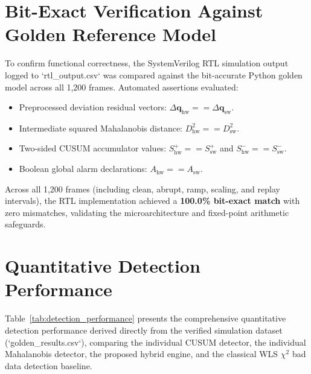 \documentclass[12pt,a4paper]{report}
\begin{document}
\section{Bit-Exact Verification Against Golden Reference Model}
To confirm functional correctness, the SystemVerilog RTL simulation output logged to
`rtl_output.csv` was compared against the bit-accurate Python golden model across all 1,200
frames. Automated assertions evaluated:
\begin{itemize}
    \item Preprocessed deviation residual vectors: $\Delta\boldsymbol{q}_{\text{hw}} == \Delta\boldsymbol{q}_{\text{sw}}$.
    \item Intermediate squared Mahalanobis distance: $D^2_{\text{hw}} == D^2_{\text{sw}}$.
    \item Two-sided CUSUM accumulator values: $S^+_{\text{hw}} == S^+_{\text{sw}}$ and $S^-_{\text{hw}} == S^-_{\text{sw}}$.
    \item Boolean global alarm declarations: $A_{\text{hw}} == A_{\text{sw}}$.
\end{itemize}
Across all 1,200 frames (including clean, abrupt, ramp, scaling, and replay intervals),
the RTL implementation achieved a \textbf{100.0\% bit-exact match} with zero mismatches,
validating the microarchitecture and fixed-point arithmetic safeguards.

\section{Quantitative Detection Performance}
Table~\ref{tab:detection_performance} presents the comprehensive quantitative detection
performance derived directly from the verified simulation dataset (`golden_results.csv`),
comparing the individual CUSUM detector, the individual Mahalanobis detector, the proposed
hybrid engine, and the classical WLS $\chi^2$ bad data detection baseline.
\end{document}
